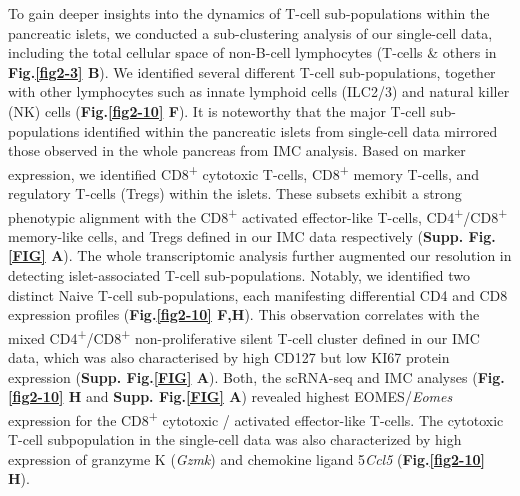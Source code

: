 To gain deeper insights into the dynamics of T-cell sub-populations within the pancreatic islets, we conducted a sub-clustering analysis of our single-cell data, including the total cellular space of non-B-cell lymphocytes (T-cells \& others in \textbf{Fig.\ref{fig2-3} B}). We identified several different T-cell sub-populations, together with other lymphocytes such as innate lymphoid cells (ILC2/3) and natural killer (NK) cells (\textbf{Fig.\ref{fig2-10} F}). It is noteworthy that the major T-cell sub-populations identified within the pancreatic islets from single-cell data mirrored those observed in the whole pancreas from IMC analysis. Based on marker expression, we identified CD8\textsuperscript{+} cytotoxic T-cells, CD8\textsuperscript{+} memory T-cells, and regulatory T-cells (Tregs) within the islets. These subsets exhibit a strong phenotypic alignment with the CD8\textsuperscript{+} activated effector-like T-cells, CD4\textsuperscript{+}/CD8\textsuperscript{+} memory-like cells, and Tregs defined in our IMC data respectively (\textbf{Supp. Fig.\ref{FIG} A}). The whole transcriptomic analysis further augmented our resolution in detecting islet-associated T-cell sub-populations. Notably, we identified two distinct Naive T-cell sub-populations, each manifesting differential CD4 and CD8 expression profiles (\textbf{Fig.\ref{fig2-10} F,H}). This  observation correlates with the mixed CD4\textsuperscript{+}/CD8\textsuperscript{+} non-proliferative silent T-cell cluster defined in our IMC data, which was also characterised by high CD127 but low KI67 protein expression (\textbf{Supp. Fig.\ref{FIG} A}). Both, the scRNA-seq and IMC analyses (\textbf{Fig.\ref{fig2-10} H} and \textbf{Supp. Fig.\ref{FIG} A}) revealed highest EOMES/\textit{Eomes} expression for the CD8\textsuperscript{+} cytotoxic / activated effector-like T-cells. The cytotoxic T-cell subpopulation in the single-cell data was also characterized by high expression of granzyme K (\textit{Gzmk}) and chemokine ligand 5\textit{Ccl5} (\textbf{Fig.\ref{fig2-10} H}).

